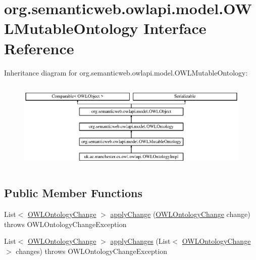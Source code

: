 \hypertarget{interfaceorg_1_1semanticweb_1_1owlapi_1_1model_1_1_o_w_l_mutable_ontology}{\section{org.\-semanticweb.\-owlapi.\-model.\-O\-W\-L\-Mutable\-Ontology Interface Reference}
\label{interfaceorg_1_1semanticweb_1_1owlapi_1_1model_1_1_o_w_l_mutable_ontology}
}
Inheritance diagram for org.\-semanticweb.\-owlapi.\-model.\-O\-W\-L\-Mutable\-Ontology\-:\begin{figure}[H]
\begin{center}
\leavevmode
\includegraphics[height=4.375000cm]{interfaceorg_1_1semanticweb_1_1owlapi_1_1model_1_1_o_w_l_mutable_ontology}
\end{center}
\end{figure}
\subsection*{Public Member Functions}
\begin{DoxyCompactItemize}
\item 
List$<$ \hyperlink{classorg_1_1semanticweb_1_1owlapi_1_1model_1_1_o_w_l_ontology_change}{O\-W\-L\-Ontology\-Change} $>$ \hyperlink{interfaceorg_1_1semanticweb_1_1owlapi_1_1model_1_1_o_w_l_mutable_ontology_a1ed4a2114050ccff1fa91d86271e6ff1}{apply\-Change} (\hyperlink{classorg_1_1semanticweb_1_1owlapi_1_1model_1_1_o_w_l_ontology_change}{O\-W\-L\-Ontology\-Change} change)  throws O\-W\-L\-Ontology\-Change\-Exception
\item 
List$<$ \hyperlink{classorg_1_1semanticweb_1_1owlapi_1_1model_1_1_o_w_l_ontology_change}{O\-W\-L\-Ontology\-Change} $>$ \hyperlink{interfaceorg_1_1semanticweb_1_1owlapi_1_1model_1_1_o_w_l_mutable_ontology_ab9d9ceb1f5f68208fb8641c8b3c671c1}{apply\-Changes} (List$<$ \hyperlink{classorg_1_1semanticweb_1_1owlapi_1_1model_1_1_o_w_l_ontology_change}{O\-W\-L\-Ontology\-Change} $>$ changes)  throws O\-W\-L\-Ontology\-Change\-Exception
\end{DoxyCompactItemize}


